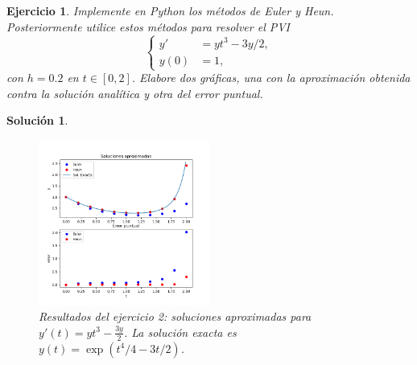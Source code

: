 \documentclass[11pt]{article}
\newtheorem{exercise}{Ejercicio}
\newtheorem*{sol}{Solución}
\begin{document}
\begin{exercise}
  Implemente en Python los métodos de Euler y Heun. Posteriormente
  utilice estos métodos para resolver el PVI
  \begin{equation}
    \left\{
      \begin{aligned}
        y' &= yt^{3} - 3y / 2, \\
        y(0) &= 1,
      \end{aligned}
    \right.
  \end{equation}
  con $h=0.2$ en $t\in [0,2]$. Elabore dos gráficas, una con la
  aproximación obtenida contra la solución analítica y otra del error
  puntual.
\end{exercise}
\begin{sol}
  \begin{figure}[ht]
    \centering
    \includegraphics[width=0.5\textwidth]{img/jaac_tarea1_ejercicio2}
    \caption{Resultados del ejercicio 2: soluciones aproximadas para
      $y'(t)=yt^{3}-\frac{3y}{2}$.
      La solución exacta es $y(t)=\exp(t^{4} / 4 - 3t / 2)$.}
    \label{fig:exe_1}
  \end{figure}
\end{sol}
\end{document}

